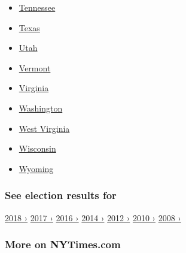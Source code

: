 \begin{itemize}
{  Dakota}
\item
  \href{https://www.nytimes.com/interactive/2018/11/06/us/elections/results-tennessee-elections.html}{Tennessee}
\item
  \href{https://www.nytimes.com/interactive/2018/11/06/us/elections/results-texas-elections.html}{Texas}
\item
  \href{https://www.nytimes.com/interactive/2018/11/06/us/elections/results-utah-elections.html}{Utah}
\item
  \href{https://www.nytimes.com/interactive/2018/11/06/us/elections/results-vermont-elections.html}{Vermont}
\item
  \href{https://www.nytimes.com/interactive/2018/11/06/us/elections/results-virginia-elections.html}{Virginia}
\item
  \href{https://www.nytimes.com/interactive/2018/11/06/us/elections/results-washington-elections.html}{Washington}
\item
  \href{https://www.nytimes.com/interactive/2018/11/06/us/elections/results-west-virginia-elections.html}{West
  Virginia}
\item
  \href{https://www.nytimes.com/interactive/2018/11/06/us/elections/results-wisconsin-elections.html}{Wisconsin}
\item
  \href{https://www.nytimes.com/interactive/2018/11/06/us/elections/results-wyoming-elections.html}{Wyoming}
\end{itemize}

\hypertarget{see-election-results-for}{%
\subsubsection{See election results
for}\label{see-election-results-for}}

\href{https://www.nytimes.com/interactive/2018/us/elections/calendar-primary-results.html}{2018
›}
\href{https://www.nytimes.com/interactive/2017/us/elections/election-calendar.html}{2017
›} \href{https://www.nytimes.com/elections/results/president}{2016 ›}
\href{https://www.nytimes.com/elections/2014/results/senate}{2014 ›}
\href{https://www.nytimes.com/elections/2012/results/president.html}{2012
›}
\href{https://www.nytimes.com/elections/2010/results/senate.html}{2010
›}
\href{https://www.nytimes.com/elections/2008/results/president/map.html}{2008
›}

\hypertarget{more-on-nytimescom}{%
\subsubsection{More on NYTimes.com}\label{more-on-nytimescom}}


